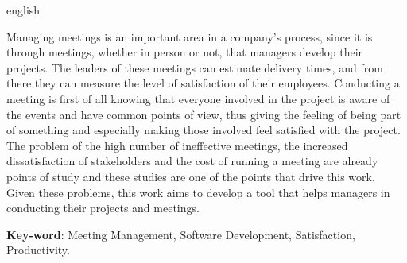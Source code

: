 \begin{resumo}[Abstract]
 \begin{otherlanguage*}{english}

  Managing meetings is an important area in a company's process, since it is through meetings, whether in person or not, that managers develop their projects. The leaders of these meetings can estimate delivery times, and from there they can measure the level of satisfaction of their employees. Conducting a meeting is first of all knowing that everyone involved in the project is aware of the events and have common points of view, thus giving the feeling of being part of something and especially making those involved feel satisfied with the project. The problem of the high number of ineffective meetings, the increased dissatisfaction of stakeholders and the cost of running a meeting are already points of study and these studies are one of the points that drive this work. Given these problems, this work aims to develop a tool that helps managers in conducting their projects and meetings.

   \vspace{\onelineskip}

   \noindent
   \textbf{Key-word}: Meeting Management, Software Development, Satisfaction, Productivity.
 \end{otherlanguage*}
\end{resumo}
